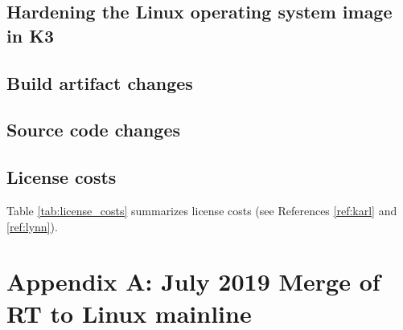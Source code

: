 \documentclass[12pt]{article}
\begin{document}
\subsection{Hardening the Linux operating system image in K3}


%


\subsection{Build artifact changes}


\subsection{Source code changes}


\subsection{License costs}

Table \ref{tab:license_costs} summarizes license costs (see References
\ref{ref:karl} and \ref{ref:lynn}).

\begin{table}[H]
\captionsetup{width=.9\linewidth}
\caption{License costs}
\label{tab:license_costs}
\end{table}


%
\newpage
\section{Appendix A: July 2019 Merge of RT to Linux mainline}
\end{document}

